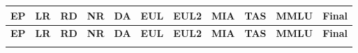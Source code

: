 \documentclass[11pt]{article}
\begin{document}
\begin{longtable}[h]{|r|r|l|l|l|l|l|r|r|l|r|}



\hline
\multicolumn{1}{|c|}{\textbf{EP}} & \multicolumn{1}{c|}{\textbf{LR}} & \multicolumn{1}{c|}{\textbf{RD}} & \multicolumn{1}{c|}{\textbf{NR}} & \multicolumn{1}{c|}{\textbf{DA}} & \multicolumn{1}{c|}{\textbf{EUL}} & \multicolumn{1}{c|}{\textbf{EUL2}} & \multicolumn{1}{c|}{\textbf{MIA}} & \multicolumn{1}{c|}{\textbf{TAS}} & \multicolumn{1}{c|}{\textbf{MMLU}} & \multicolumn{1}{c|}{\textbf{Final}} \\ 
\hline
\endfirsthead

\hline
\multicolumn{1}{|c|}{\textbf{EP}} & \multicolumn{1}{c|}{\textbf{LR}} & \multicolumn{1}{c|}{\textbf{RD}} & \multicolumn{1}{c|}{\textbf{NR}} & \multicolumn{1}{c|}{\textbf{DA}} & \multicolumn{1}{c|}{\textbf{EUL}} & \multicolumn{1}{c|}{\textbf{EUL2}} & \multicolumn{1}{c|}{\textbf{MIA}} & \multicolumn{1}{c|}{\textbf{TAS}} & \multicolumn{1}{c|}{\textbf{MMLU}} & \multicolumn{1}{c|}{\textbf{Final}} \\
\hline
\endhead

\hline
\endfoot


\end{longtable}
\end{document}
